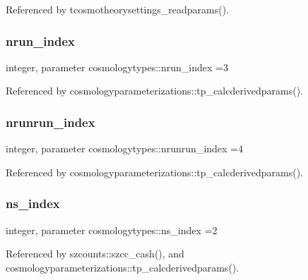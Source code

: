 Referenced by tcosmotheorysettings\+\_\+readparams().

\mbox{\label{namespacecosmologytypes_ae7086a888c94e02609c59f8c5fa2dbf1}} 
\subsubsection{\texorpdfstring{nrun\+\_\+index}{nrun\_index}}
{\footnotesize\ttfamily integer, parameter cosmologytypes\+::nrun\+\_\+index =3}



Referenced by cosmologyparameterizations\+::tp\+\_\+calcderivedparams().

\mbox{\label{namespacecosmologytypes_ab8b99958a1c9ab51eb091e6e5aab271e}} 
\subsubsection{\texorpdfstring{nrunrun\+\_\+index}{nrunrun\_index}}
{\footnotesize\ttfamily integer, parameter cosmologytypes\+::nrunrun\+\_\+index =4}



Referenced by cosmologyparameterizations\+::tp\+\_\+calcderivedparams().

\mbox{\label{namespacecosmologytypes_a94ac6353d15b78b217f2ea727a13584f}} 
\subsubsection{\texorpdfstring{ns\+\_\+index}{ns\_index}}
{\footnotesize\ttfamily integer, parameter cosmologytypes\+::ns\+\_\+index =2}



Referenced by szcounts\+::szcc\+\_\+cash(), and cosmologyparameterizations\+::tp\+\_\+calcderivedparams().

\mbox{\label{namespacecosmologytypes_a81146d2bca96d38cce3742a77963bca3}} 
